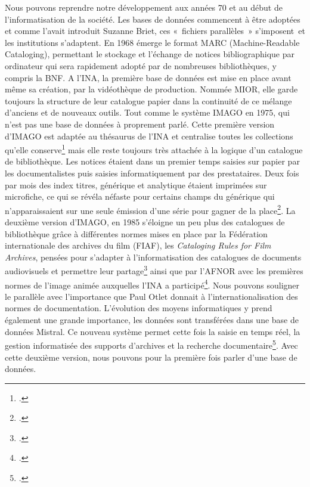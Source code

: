 Nous pouvons reprendre notre développement aux années 70 et au début de l'informatisation de la société. Les bases de données commencent à être adoptées et comme l’avait introduit Suzanne Briet, ces « fichiers parallèles » s’imposent et les institutions s’adaptent. En 1968 émerge le format MARC (Machine-Readable Cataloging), permettant le stockage et l’échange de notices bibliographique par ordinateur qui sera rapidement adopté par de nombreuses bibliothèques, y compris la BNF. A l’INA, la première base de données est mise en place avant même sa création, par la vidéothèque de production. Nommée MIOR, elle garde toujours la structure de leur catalogue papier dans la continuité de ce mélange d’anciens et de nouveaux outils. Tout comme le système IMAGO en 1975, qui n'est pas une base de données à proprement parlé. Cette première version d’IMAGO est adaptée au thésaurus de l’INA et centralise toutes les collections qu’elle conserve\footcite[][42-44]{bassaïstéguy2025} mais elle reste toujours très attachée à la logique d’un catalogue de bibliothèque. Les notices étaient dans un premier temps saisies sur papier par les documentalistes puis saisies informatiquement par des prestataires. Deux fois par mois des index titres, générique et analytique étaient imprimées sur microfiche, ce qui se révéla néfaste pour certains champs du générique qui n'apparaissaient sur une seule émission d'une série pour gagner de la place\footcite[]{saintville1994}. La deuxième version d'IMAGO, en 1985 s’éloigne un peu plus des catalogues de bibliothèque grâce à différentes normes mises en place par la Fédération internationale des archives du film (FIAF), les \textit{Cataloging Rules for Film Archives}, pensées pour s’adapter à l’informatisation des catalogues de documents audiovisuels et permettre leur partage\footcite[][50]{bassaïstéguy2025} ainsi que par l'AFNOR avec les premières normes de l'image animée auxquelles l'INA a participé\footcite[]{saintville1994}. Nous pouvons souligner le parallèle avec l’importance que Paul Otlet donnait à l’internationalisation des normes de documentation. L’évolution des moyens informatiques y prend également une grande importance, les données sont transférées dans une base de données Mistral. Ce nouveau système permet cette fois la saisie en temps réel, la gestion informatisée des supports d'archives et la recherche documentaire\footcite{saintville1994}. Avec cette deuxième version, nous pouvons pour la première fois parler d'une base de données. 


